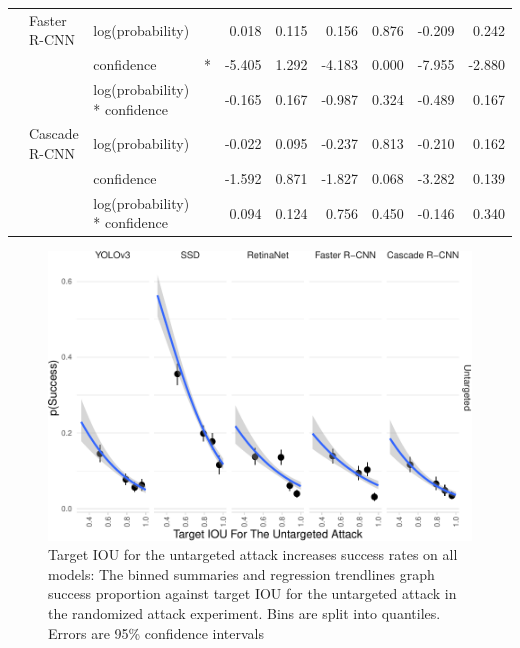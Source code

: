 \begin{longtable}[t]{llllrrrrrr}
\cmidrule{2-10}\nopagebreak
\hspace{1em} & Faster R-CNN & log(probability) &  & 0.018 & 0.115 & 0.156 & 0.876 & -0.209 & 0.242\\
\cmidrule{3-10}\nopagebreak
\hspace{1em} &  & confidence & * & -5.405 & 1.292 & -4.183 & 0.000 & -7.955 & -2.880\\
\cmidrule{3-10}\nopagebreak
\hspace{1em} &  & log(probability) * confidence &  & -0.165 & 0.167 & -0.987 & 0.324 & -0.489 & 0.167\\
\cmidrule{2-10}\nopagebreak
\hspace{1em} & Cascade R-CNN & log(probability) &  & -0.022 & 0.095 & -0.237 & 0.813 & -0.210 & 0.162\\
\cmidrule{3-10}\nopagebreak
\hspace{1em} &  & confidence &  & -1.592 & 0.871 & -1.827 & 0.068 & -3.282 & 0.139\\
\cmidrule{3-10}\nopagebreak
\hspace{1em} &  & log(probability) * confidence &  & 0.094 & 0.124 & 0.756 & 0.450 & -0.146 & 0.340\\
\bottomrule
\end{longtable}
\endgroup{}

\begin{figure}[tb]

{\centering \includegraphics{imgs/untarget_iou_graph-1} 

}

\caption{Target IOU for the untargeted attack increases success rates on all models:  The binned summaries and regression trendlines graph success proportion against target IOU for the untargeted attack in the randomized attack experiment. Bins are split into quantiles. Errors are 95\% confidence intervals}\label{fig:untarget_iou_graph}
\end{figure}

